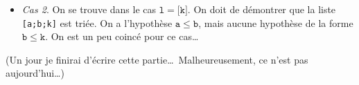 \documentclass[../main]{subfiles}
\begin{document}
{\begin{itemize}
      Notre objectif a changé, on doit maintenant démontrer $\mathsf{le}\ \mathtt{a}\ \mathtt{b}$.
      C'est une de nos hypothèses, on peut donc utiliser :
      \begin{lstlisting}
    assumption.
      \end{lstlisting}
      Ceci termine le cas 1.
    \item \textsl{Cas 2}. On se trouve dans le cas $\mathtt{l} = \texttt{[k]}$.
      On doit de démontrer que la liste \texttt{[a;b;k]} est triée.
      On a l'hypothèse $\mathtt{a} \le \mathtt{b}$, mais aucune hypothèse de la forme $\mathtt{b} \le \mathtt{k}$.
      On est un peu coincé pour ce cas\ldots
  \end{itemize}
  }


  (Un jour je finirai d'écrire cette partie\ldots\
  Malheureusement, ce n'est pas aujourd'hui\ldots)
\end{document}
